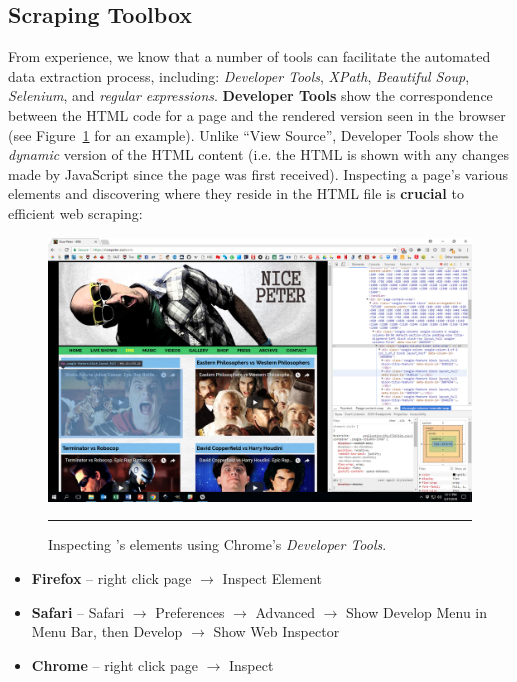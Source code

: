 \subsection{Scraping Toolbox} From experience, we know that a number of tools can facilitate the automated data extraction process, including: 
\textit{Developer Tools}, \textit{XPath}, \textit{Beautiful Soup}, \textit{Selenium}, and \textit{regular expressions}. 
\newl\textbf{Developer Tools} show the correspondence between the HTML code for a page and the rendered version seen in the browser (see Figure~\ref{fig:erb} for an example). Unlike ``View Source'', Developer Tools show the \textit{dynamic} version of the HTML content (i.e. the HTML is shown with any changes made by JavaScript since the page was first received). Inspecting a page's various elements and discovering where they reside in the HTML file is \textbf{crucial} to efficient web scraping: 
\begin{figure}[t]
\centering
\includegraphics[width=\textwidth]{Images/erb.png}
\caption[\small Inspecting a webpage elements using Chrome's \textit{Developer Tools}]{\small Inspecting 's elements using Chrome's \textit{Developer Tools}.} \hrule\label{fig:erb}
\end{figure}
\begin{itemize}[noitemsep]
\item \textbf{Firefox} -- right click page $\to$ Inspect Element
\item \textbf{Safari} -- Safari $\to$ Preferences $\to$ Advanced $\to$ Show Develop Menu in Menu Bar, then  
Develop $\to$ Show Web Inspector
\item \textbf{Chrome} --  right click page $\to$ Inspect
\end{itemize}
